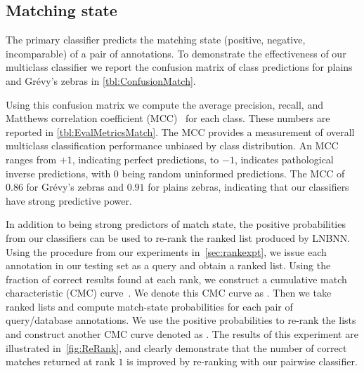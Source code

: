     \FloatBarrier{}
    \subsection{Matching state}

        The primary classifier predicts the matching state (positive, negative, incomparable) of a pair of
        annotations. To demonstrate the effectiveness of our multiclass classifier we report the confusion matrix
        of class predictions for plains and Grévy's zebras in \cref{tbl:ConfusionMatch}.

        Using this confusion matrix we compute the average precision, recall, and Matthews correlation
          coefficient (MCC)~\cite{powers_evaluation_2011} for each class.
        These numbers are reported in \cref{tbl:EvalMetricsMatch}.
        The MCC provides a measurement of overall multiclass classification performance unbiased by class
          distribution.
        An MCC ranges from $+1$, indicating perfect predictions, to $-1$, indicates pathological inverse
          predictions, with $0$ being random uninformed predictions.
        The MCC of $0.86$ for Grévy's zebras and $0.91$ for plains zebras, indicating that our classifiers have
          strong predictive power.

        \ConfusionMatch{}

        \EvalMetricsMatch{}

        In addition to being strong predictors of match state, the positive probabilities from our classifiers
          can be used to re-rank the ranked list produced by LNBNN.
        Using the procedure from our experiments in~\cref{sec:rankexpt}, we issue each annotation in our testing
          set as a query and obtain a ranked list.
        Using the fraction of correct results found at each rank, we construct a cumulative match characteristic
          (CMC) curve~\cite{decann_relating_2013}.
        We denote this CMC curve as .
        Then we take ranked lists and compute match-state probabilities for each pair of query/database
          annotations.
        We use the positive probabilities to re-rank the lists and construct another CMC curve denoted as
          .
        The results of this experiment are illustrated in~\cref{fig:ReRank}, and clearly demonstrate that the
          number of correct matches returned at rank $1$ is improved by re-ranking with our pairwise classifier.
        

